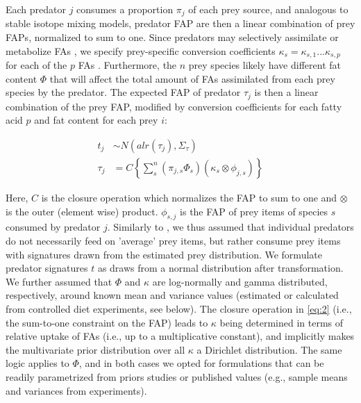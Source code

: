 \documentclass{article}%
\begin{document}
\begin{spacing}{1.9}
\begin{flushleft}
Each predator $j$ consumes a proportion $\pi_j$ of each prey source, and
analogous to stable isotope mixing models, predator FAP are then a
linear combination of prey FAPs, normalized to sum to one. Since predators may selectively assimilate or metabolize FAs
\citep{iverson_quantitative_2004,budge_studying_2006,rosen_effects_2012},
we specify prey-specific conversion coefficients $\kappa_{s}
= \kappa_{s,1}...\kappa_{s,p}$ for each of the $p$ FAs \citep{rosen_effects_2012}. Furthermore,
the $n$ prey species likely have different fat content $\Phi$
that will affect the total amount of FAs assimilated from each
prey species by the
predator. The expected FAP of predator $\tau_j$ is then a linear combination of the prey
FAP, modified by conversion coefficients for each fatty acid $p$ and fat
content for each prey $i$:

\begin{align}
\label{eq:2}
t_j &\sim N(alr(\tau_{j}),\Sigma_{\tau})\\
\tau_{j} &= C \left\{ \sum_{s}^n  \left(\pi_{j,s} \Phi_{s} \right) \left(
    \kappa_{s} \otimes \phi_{j,s} \right) \right\}
\end{align}

Here, $C$ is the closure operation which normalizes the FAP to sum to
one and $\otimes$ is the outer (element wise) product. $\phi_{s,j}$ is
the FAP of prey items of species $s$ consumed by predator
$j$. Similarly to \citet{parnell_bayesian_2012},
we thus assumed that individual predators do not necessarily feed on
'average' prey items, but rather consume prey items with
signatures drawn from the estimated prey distribution. We
formulate predator signatures $t$ as draws from a normal distribution after
transformation. We further assumed that
$\Phi$ and $\kappa$ are log-normally and gamma
distributed, respectively, around known mean and variance values (estimated or
calculated from controlled diet experiments, see below). The
closure operation in \autoref{eq:2} (i.e., the sum-to-one constraint
on the FAP) leads to $\kappa$ being determined in terms of
relative uptake of FAs (i.e., up to a multiplicative
constant), and implicitly makes the multivariate prior distribution over all $\kappa$ a Dirichlet
distribution. The same logic applies to $\Phi$, and in both cases we
opted for formulations that can be readily parametrized from priors
studies or published values (e.g., sample means and variances from experiments).


\end{flushleft}
\end{spacing}
\end{document}
